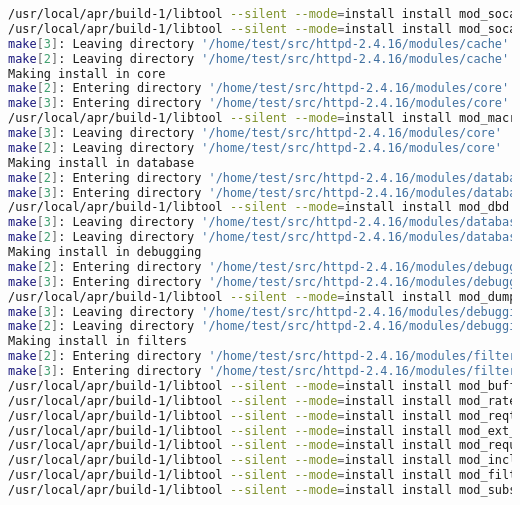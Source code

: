 \begin{lstlisting}[language=bash]
/usr/local/apr/build-1/libtool --silent --mode=install install mod_socache_dbm.la /usr/local/apache2/modules/
/usr/local/apr/build-1/libtool --silent --mode=install install mod_socache_memcache.la /usr/local/apache2/modules/
make[3]: Leaving directory '/home/test/src/httpd-2.4.16/modules/cache'
make[2]: Leaving directory '/home/test/src/httpd-2.4.16/modules/cache'
Making install in core
make[2]: Entering directory '/home/test/src/httpd-2.4.16/modules/core'
make[3]: Entering directory '/home/test/src/httpd-2.4.16/modules/core'
/usr/local/apr/build-1/libtool --silent --mode=install install mod_macro.la /usr/local/apache2/modules/
make[3]: Leaving directory '/home/test/src/httpd-2.4.16/modules/core'
make[2]: Leaving directory '/home/test/src/httpd-2.4.16/modules/core'
Making install in database
make[2]: Entering directory '/home/test/src/httpd-2.4.16/modules/database'
make[3]: Entering directory '/home/test/src/httpd-2.4.16/modules/database'
/usr/local/apr/build-1/libtool --silent --mode=install install mod_dbd.la /usr/local/apache2/modules/
make[3]: Leaving directory '/home/test/src/httpd-2.4.16/modules/database'
make[2]: Leaving directory '/home/test/src/httpd-2.4.16/modules/database'
Making install in debugging
make[2]: Entering directory '/home/test/src/httpd-2.4.16/modules/debugging'
make[3]: Entering directory '/home/test/src/httpd-2.4.16/modules/debugging'
/usr/local/apr/build-1/libtool --silent --mode=install install mod_dumpio.la /usr/local/apache2/modules/
make[3]: Leaving directory '/home/test/src/httpd-2.4.16/modules/debugging'
make[2]: Leaving directory '/home/test/src/httpd-2.4.16/modules/debugging'
Making install in filters
make[2]: Entering directory '/home/test/src/httpd-2.4.16/modules/filters'
make[3]: Entering directory '/home/test/src/httpd-2.4.16/modules/filters'
/usr/local/apr/build-1/libtool --silent --mode=install install mod_buffer.la /usr/local/apache2/modules/
/usr/local/apr/build-1/libtool --silent --mode=install install mod_ratelimit.la /usr/local/apache2/modules/
/usr/local/apr/build-1/libtool --silent --mode=install install mod_reqtimeout.la /usr/local/apache2/modules/
/usr/local/apr/build-1/libtool --silent --mode=install install mod_ext_filter.la /usr/local/apache2/modules/
/usr/local/apr/build-1/libtool --silent --mode=install install mod_request.la /usr/local/apache2/modules/
/usr/local/apr/build-1/libtool --silent --mode=install install mod_include.la /usr/local/apache2/modules/
/usr/local/apr/build-1/libtool --silent --mode=install install mod_filter.la /usr/local/apache2/modules/
/usr/local/apr/build-1/libtool --silent --mode=install install mod_substitute.la /usr/local/apache2/modules/

\end{lstlisting}
